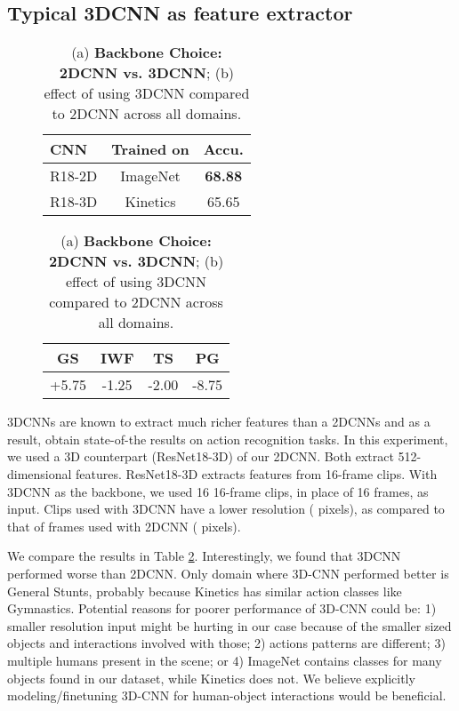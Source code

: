 \documentclass[final]{cvpr}
\begin{document}
\subsection{Typical 3DCNN as feature extractor}
\label{sec:exp_2dvs3d}
\begin{table}[]
\small
\centering
\begin{subfigure}[t]{0.45\columnwidth}
\centering
\setlength\tabcolsep{4pt}
\begin{tabular}{lcc}
\toprule
\textbf{CNN} & \textbf{Trained on} & \textbf{Accu.} \\ \midrule
R18-2D         & ImageNet & \textbf{68.88}             \\
R18-3D         & Kinetics & 65.65             \\ \bottomrule
\end{tabular}
\caption{}
\label{tab:2dvs3d_a}
\end{subfigure}
\hfill
\begin{subfigure}[t]{0.45\columnwidth}
\centering
\setlength\tabcolsep{4pt}
\begin{tabular}{@{}cccc@{}}
\toprule
\textbf{GS} & \textbf{IWF} & \textbf{TS} & \textbf{PG} \\ \midrule
+5.75       & -1.25         & -2.00        & -8.75        \\ \bottomrule
\end{tabular}
\caption{}
\label{tab:2dvs3d_b}
\end{subfigure}
\caption{(a) \textbf{Backbone Choice: 2DCNN vs. 3DCNN}; (b) effect of using 3DCNN compared to 2DCNN across all domains.}
\label{tab:2dvs3d}
\end{table}
 3DCNNs are known to extract much richer features than a 2DCNNs and as a result, obtain state-of-the results on action recognition tasks. In this experiment, we used a 3D counterpart (ResNet18-3D) of our 2DCNN. Both extract 512-dimensional features. ResNet18-3D extracts features from 16-frame clips. With 3DCNN as the backbone, we used 16 16-frame clips, in place of 16 frames, as input. Clips used with 3DCNN have a lower resolution ( pixels), as compared to that of frames used with 2DCNN ( pixels).

We compare the results in Table \ref{tab:2dvs3d}. Interestingly, we found that 3DCNN performed worse than 2DCNN. Only domain where 3D-CNN performed better is General Stunts, probably because Kinetics has similar action classes like Gymnastics. Potential reasons for poorer performance of 3D-CNN could be: 1) smaller resolution input might be hurting in our case because of the smaller sized objects and interactions involved with those; 2) actions patterns are different; 3) multiple humans present in the scene; or 4) ImageNet contains classes for many objects found in our dataset, while Kinetics does not.  We believe explicitly modeling/finetuning 3D-CNN for human-object interactions would be beneficial. 
\end{document}

